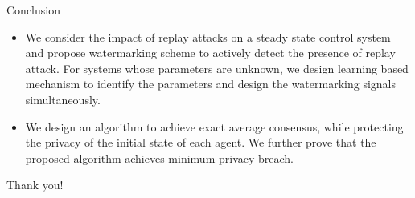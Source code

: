 \documentclass[10pt]{beamer}
\begin{document}
  \begin{frame}{Conclusion}
    \begin{itemize}
    \item We consider the impact of replay attacks on a steady state control system and propose watermarking scheme to actively detect the presence of replay attack. For systems whose parameters are unknown, we design learning based mechanism to identify the parameters and design the watermarking signals simultaneously.
      \item We design an algorithm to achieve exact average consensus, while protecting the privacy of the initial state of each agent. We further prove that the proposed algorithm achieves minimum privacy breach.
    \end{itemize}
  \end{frame}

  \begin{frame}[standout]
    Thank you!
  \end{frame}
\end{document}
